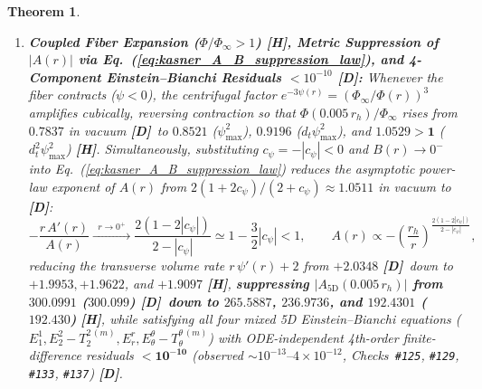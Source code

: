 \documentclass[11pt,a4paper]{article}
\newcommand{\catD}{\textbf{\textcolor{blue!75!black}{[D]}}}
\newcommand{\catH}{\textbf{\textcolor{orange!85!black}{[H]}}}
\theoremstyle{plain}
\newtheorem{theorem}{Theorem}[section]
\theoremstyle{definition}
\theoremstyle{remark}
\numberwithin{equation}{section}
\begin{document}
\begin{theorem}
\begin{enumerate}
    \item[\textnormal{(ii)}] \textbf{Coupled Fiber Expansion ($\Phi/\Phi_{\infty} > 1$) \catH, Metric Suppression of $|A(r)|$ via Eq.~(\ref{eq:kasner_A_B_suppression_law}), and 4-Component Einstein--Bianchi Residuals $< 10^{-10}$ \catD:} Whenever the fiber contracts ($\psi < 0$), the centrifugal factor $e^{-3\psi(r)} = (\Phi_{\infty}/\Phi(r))^3$ amplifies cubically, reversing contraction so that $\Phi(0.005\,r_h)/\Phi_{\infty}$ rises from $0.7837$ in vacuum \catD\ to $0.8521$ ($\psi_{\max}^2$), $0.9196$ ($d_t\psi_{\max}^2$), and $\mathbf{1.0529 > 1}$ ($d_t^2\psi_{\max}^2$) \catH. Simultaneously, substituting $c_{\psi} = -|c_{\psi}| < 0$ and $B(r) \to 0^-$ into Eq.~(\ref{eq:kasner_A_B_suppression_law}) reduces the asymptotic power-law exponent of $A(r)$ from $2(1 + 2c_{\psi})/(2 + c_{\psi}) \approx 1.0511$ in vacuum to \catD:
    \begin{equation}
      -\frac{r\,A'(r)}{A(r)} \xrightarrow{\;\;r \to 0^+\;\;} \frac{2\left(1 - 2|c_{\psi}|\right)}{2 - |c_{\psi}|} \simeq 1 - \frac{3}{2}|c_{\psi}| < 1, \qquad A(r) \propto -\left(\frac{r_h}{r}\right)^{\!\frac{2(1 - 2|c_{\psi}|)}{2 - |c_{\psi}|}},
      \label{eq:coupled_A_exponent_reduction}
    \end{equation}
    reducing the transverse volume rate $r\,\psi'(r) + 2$ from $+2.0348$ \catD\ down to $+1.9953, +1.9622$, and $+1.9097$ \catH, \textbf{suppressing $|A_{\text{5D}}(0.005\,r_h)|$ from $300.0991$ ($300.099$) \catD\ down to $265.5887$, $236.9736$, and $192.4301$ ($192.430$)} \catH, while satisfying all four mixed 5D Einstein--Bianchi equations ($E^1_1, E^2_2 - T^{2\,(m)}_2, E^r_r, E^{\theta}_{\theta} - T^{\theta\,(m)}_{\theta}$) with ODE-independent 4th-order finite-difference residuals $< \mathbf{10^{-10}}$ (observed $\sim 10^{-13}\text{--}4 \times 10^{-12}$, Checks~\texttt{\#125}, \texttt{\#129}, \texttt{\#133}, \texttt{\#137}) \catD.
\end{enumerate}
\end{theorem}
\end{document}
